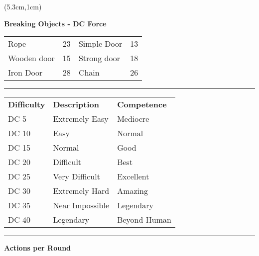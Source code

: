 \documentclass[a4paper,12 pt,openany]{book}
\newcommand{\linex}{\rule{\textwidth}{0.4pt}}
\begin{document}
\begin{textblock*}{8.3cm}(5.3cm,1cm)

\textbf{Breaking Objects - DC Force}\\
\begin{tabular}{ll|ll}
Rope & 23& Simple Door & 13\\
Wooden door & 15& Strong door & 18\\
Iron Door & 28& Chain & 26 \\
\end{tabular}

\linex

\begin{tabular}{lll}
\textbf{Difficulty} & \textbf{Description} & \textbf{Competence} \\
DC 5 & Extremely Easy & Mediocre \\
DC 10 & Easy & Normal \\
DC 15 & Normal & Good \\
DC 20 & Difficult & Best \\
DC 25 & Very Difficult & Excellent \\
DC 30 & Extremely Hard & Amazing \\
DC 35 & Near Impossible & Legendary \\
DC 40 & Legendary & Beyond Human \\
\end{tabular}


\linex

\textbf{Actions per Round}


\end{textblock*}
\end{document}

